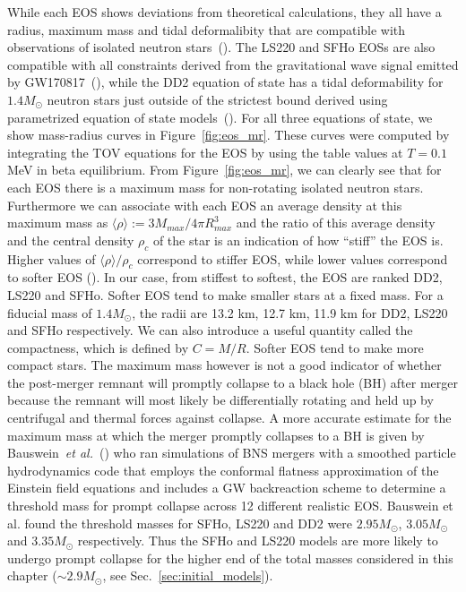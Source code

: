 While each EOS shows deviations from theoretical calculations, they all have a radius, maximum mass and tidal deformalibity that are compatible with observations of isolated neutron stars~(\citet*{demorest:2010bx,hempel2017well}). The LS220 and SFHo EOSs are also compatible with all constraints derived from the gravitational wave signal emitted by GW170817~(\citet*{gw170817-pe,gw170817-nsradius}), while the DD2 equation of state has a tidal deformability for $1.4M_\odot$ neutron stars just outside of the strictest bound derived using parametrized equation of state models~(\citet*{gw170817-nsradius}). For all three equations of state, we show mass-radius curves in Figure~\ref{fig:eos_mr}. These curves were computed by integrating the TOV equations for the EOS by using the table values at $T=0.1$\,MeV in beta equilibrium. From Figure~\ref{fig:eos_mr}, we can clearly see that for each EOS there is a maximum mass for non-rotating isolated neutron stars. Furthermore we can associate with each EOS an average density at this maximum mass as $\langle \rho \rangle := 3M_{max}/4\pi R^3_{max}$ and the ratio of this average density and the central density $\rho_c$ of the star is an indication of how ``stiff'' the EOS is. Higher values of $\langle \rho \rangle/\rho_c$ correspond to stiffer EOS, while lower values correspond to softer EOS (\citet*{bauswein2013prompt}). In our case, from stiffest to softest, the EOS are ranked DD2, LS220 and SFHo. Softer EOS tend to make smaller stars at a fixed mass. For a fiducial mass of $1.4M_\odot$, the radii are 13.2 km, 12.7 km, 11.9 km for DD2, LS220 and SFHo respectively. We can also introduce a useful quantity called the compactness, which is defined by $C=M/R$. Softer EOS tend to make more compact stars. The maximum mass however is not a good indicator of whether the post-merger remnant will promptly collapse to a black hole (BH) after merger because the remnant will most likely be differentially rotating and held up by centrifugal and thermal forces against collapse.
A more accurate estimate for the maximum mass at which the merger promptly collapses to a BH is given by Bauswein~{\it et al.}~(\citet*{bauswein2013prompt}) who ran simulations of BNS mergers with a smoothed particle hydrodynamics code that employs the conformal flatness approximation of the Einstein field equations and includes a GW backreaction scheme to determine a threshold mass for prompt collapse across 12 different realistic EOS. Bauswein et al. found the threshold masses for SFHo, LS220 and DD2 were $2.95M_\odot$, $3.05M_\odot$ and $3.35M_\odot$ respectively. Thus the SFHo and LS220 models are more likely to undergo prompt collapse for the higher end of the total masses considered in this chapter ($\sim 2.9M_\odot$, see Sec.~\ref{sec:initial_models}). 

